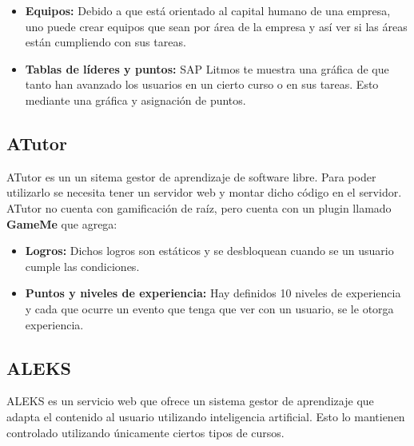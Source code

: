 \begin{multicols}{2}
\begin{itemize}
        \item {\bf Equipos: } Debido a que está orientado al capital humano
         de una empresa, uno puede crear equipos que sean por área de la
          empresa y así ver si las áreas están cumpliendo con sus tareas.
          
        \item {\bf Tablas de líderes y puntos: } SAP Litmos te muestra una
         gráfica de que tanto han avanzado los usuarios en un cierto curso
         o en sus tareas. Esto mediante una gráfica y asignación de puntos.
         
    \end{itemize}



\subsection*{ATutor}

ATutor es un un sitema gestor de aprendizaje de software libre. Para poder
utilizarlo se necesita tener un servidor web y montar dicho código en el servidor.\\
    
    \noindent ATutor no cuenta con gamificación de raíz,
    pero cuenta con un plugin llamado \textbf{GameMe} que agrega:
    
    \begin{itemize}
        \item {\bf Logros:} Dichos logros son estáticos y se
        desbloquean cuando se un usuario cumple las condiciones.
        
        \item {\bf Puntos y niveles de experiencia:} Hay definidos 10
        niveles de experiencia y cada que ocurre un evento que tenga
        que ver con un usuario, se le otorga experiencia.
        
    \end{itemize}



\subsection*{ALEKS}

ALEKS es un servicio web que ofrece un sistema gestor de aprendizaje
que adapta el contenido al usuario utilizando inteligencia artificial.
Esto lo mantienen controlado utilizando únicamente ciertos tipos de cursos.\\
    

\end{multicols}
